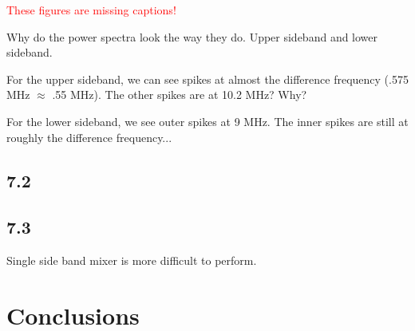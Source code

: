 \documentclass[a4paper]{article}
\begin{document}
\textcolor{red}{These figures are missing captions!}

Why do the power spectra look the way they do. Upper sideband and lower sideband.

For the upper sideband, we can see spikes at almost the difference frequency (.575 MHz $\approx$ .55 MHz). The other spikes are at 10.2 MHz? Why?

For the lower sideband, we see outer spikes at 9 MHz. The inner spikes are still at roughly the difference frequency...

\subsection{7.2}

\subsection{7.3}


Single side band mixer is more difficult to perform.

\section{Conclusions}



\end{document}
